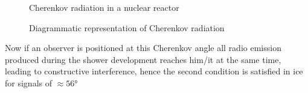 \documentclass[11pt,a4paper,faculty=we,language=en,doctype=report]{cls/ugent-doc}
\begin{document}
\begin{figure}
\centering
\begin{minipage}{0.45\textwidth}
	\centering
	\caption{Cherenkov radiation in a nuclear reactor}
	\label{figure: Cherenkov reactor}
\end{minipage}
\hspace{0.05\textwidth}
\begin{minipage}{0.45\textwidth}
	\centering
	\caption{Diagrammatic representation of Cherenkov radiation}
	\label{figure: Cherenkov illustratie}
\end{minipage}
\end{figure}
Now if an observer is positioned at this Cherenkov angle all radio emission produced during the shower development reaches him/it at the same time, leading to constructive interference, hence the second condition is satisfied in ice for signals of $\approx 56°$
\end{document}
